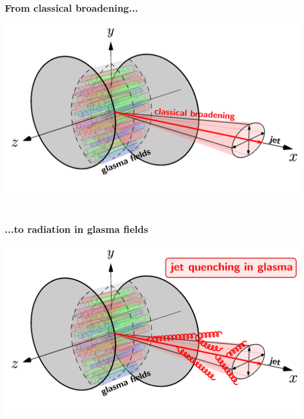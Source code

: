 \documentclass[aspectratio=169,11pt,usenames,dvipsnames]{beamer}
\begin{document}
\begin{frame}
    \frametitle{\\From classical broadening...}
    \vspace{10pt}
    \begin{center}
        \includegraphics[height=0.7\paperheight]{images/momentum_broadening_flipped_cljet.png}
    \end{center}
\end{frame}


\begin{frame}
    \frametitle{\\...to radiation in glasma fields}
    \vspace{10pt}
    \begin{center}
        \includegraphics[height=0.7\paperheight]{images/momentum_broadening_flipped_jetquenched.png}
    \end{center}
\end{frame}
\end{document}
